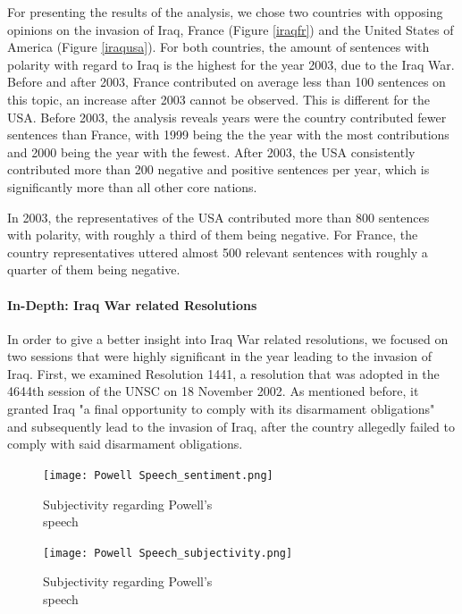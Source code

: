 For presenting the results of the analysis, we chose two countries with opposing opinions on the invasion of Iraq, France (Figure \ref{iraqfr}) and the United States of America (Figure \ref{iraqusa}).
For both countries, the amount of sentences with polarity with regard to Iraq is the highest for the year 2003, due to the Iraq War. Before and after 2003, France contributed on average less than 100 sentences on this topic, an increase after 2003 cannot be observed. This is different for the USA. Before 2003, the analysis reveals years were the country contributed fewer sentences than France, with 1999 being the the year with the most contributions and 2000 being the year with the fewest. After 2003, the USA consistently contributed more than 200 negative and positive sentences per year, which is significantly more than all other core nations.

In 2003, the representatives of the USA contributed more than 800 sentences with polarity, with roughly a third of them being negative. 
For France, the country representatives uttered almost 500 relevant sentences with roughly a quarter of them being negative.

\paragraph{In-Depth: Iraq War related Resolutions}
In order to give a better insight into Iraq War related resolutions, we focused on two sessions that were highly significant in the year leading to the invasion of Iraq. First, we examined Resolution 1441, a resolution that was adopted in the 4644th session of the UNSC on 18 November 2002. As mentioned before, it granted Iraq "a final opportunity to comply with its disarmament obligations" \citep{resolution1441} and subsequently lead to the invasion of Iraq, after the country allegedly failed to comply with said disarmament obligations.

\begin{figure}[b!]
    \centering
    \begin{minipage}{0.45\textwidth}
        \centering
        \texttt{[image: Powell Speech\_sentiment.png]} %
        \caption{Subjectivity regarding Powell's \\ speech}
        \label{powellsent}
    \end{minipage}\hfill
    \begin{minipage}{0.45\textwidth}
        \centering
        \texttt{[image: Powell Speech\_subjectivity.png]} %
        \caption{Subjectivity regarding Powell's \\ speech}
        \label{powellsubj}
    \end{minipage}
\end{figure}

